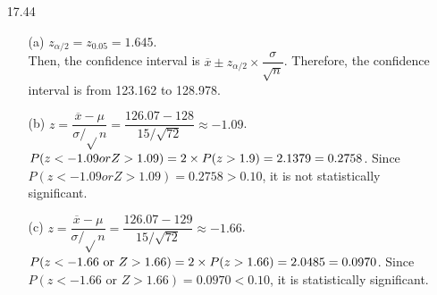 \documentclass[11pt, a4paper]{article}
\begin{document}
\begin{itemize}
\item[]
\item[]

\item[17.44]
\begin{itemize}
\item[(a)]
$z_{\alpha/2} = z_{0.05} = 1.645$.\\
Then, the confidence interval is $\overline{x} \pm z_{\alpha/2} \times \displaystyle\dfrac{\sigma}{\sqrt{n}}$.
Therefore, the confidence interval is from 123.162 to 128.978.

\item[]

\item[(b)]
$z = \displaystyle\dfrac{\overline{x} - \mu}{\sigma/\sqrt{}n} = \displaystyle\dfrac{126.07 - 128}{15/\sqrt{72}} \approx -1.09$.
$P(z < -1.09 or Z > 1.09) = 2 \times P(z > 1.9) = 2 \time 0.1379 = 0.2758$.
Since $P(z < -1.09 or Z > 1.09) = 0.2758 > 0.10$, it is not statistically significant.

\item[]

\item[(c)]
$z = \displaystyle\dfrac{\overline{x} - \mu}{\sigma/\sqrt{}n} = \displaystyle\dfrac{126.07 - 129}{15/\sqrt{72}} \approx -1.66$.
$P(z < -1.66 \text{ or } Z > 1.66) = 2 \times P(z > 1.66) = 2 \time 0.0485 = 0.0970$.
Since $P(z < -1.66 \text{ or } Z > 1.66) = 0.0970 < 0.10$, it is statistically significant.
\end{itemize}

\end{itemize}
\end{document}
